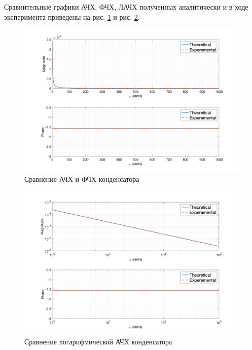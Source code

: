 Сравнительные графики АЧХ, ФЧХ, ЛАЧХ полученных аналитически и в ходе эксперимента приведены на рис. \ref{fig:task3_freq_resp_cmp_lin} и рис. \ref{fig:task3_freq_resp_cmp_loglog}.
\begin{figure}[ht!]
    \centering
    \includegraphics[width=\textwidth]{media/plots/task3_freq_resp_cmp_lin.png}
    \caption{Сравнение АЧХ и ФЧХ конденсатора}
    \label{fig:task3_freq_resp_cmp_lin}
\end{figure}
\begin{figure}[ht!]
    \centering
    \includegraphics[width=\textwidth]{media/plots/task3_freq_resp_cmp_loglog.png}
    \caption{Сравнение логарифмической АЧХ конденсатора}
    \label{fig:task3_freq_resp_cmp_loglog}
\end{figure}

